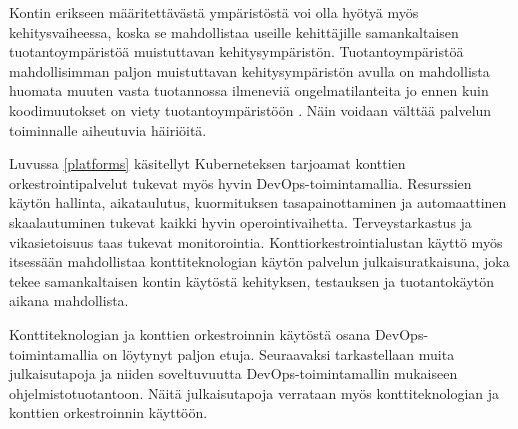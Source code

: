 Kontin erikseen määritettävästä ympäristöstä voi olla hyötyä myös kehitysvaiheessa, koska se mahdollistaa useille kehittäjille samankaltaisen tuotantoympäristöä muistuttavan kehitysympäristön.
Tuotantoympäristöä mahdollisimman paljon muistuttavan kehitysympäristön avulla on mahdollista huomata muuten vasta tuotannossa ilmeneviä ongelmatilanteita jo ennen kuin koodimuutokset on viety tuotantoympäristöön \cite{Narasimhulu23}.
Näin voidaan välttää palvelun toiminnalle aiheutuvia häiriöitä.

Luvussa \ref{platforms} käsitellyt Kuberneteksen tarjoamat konttien orkestrointipalvelut tukevat myös hyvin DevOps-toimintamallia.
Resurssien käytön hallinta, aikataulutus, kuormituksen tasapainottaminen ja automaattinen skaalautuminen tukevat kaikki hyvin operointivaihetta.
Terveystarkastus ja vikasietoisuus taas tukevat monitorointia.
Konttiorkestrointialustan käyttö myös itsessään mahdollistaa konttiteknologian käytön palvelun julkaisuratkaisuna, joka tekee samankaltaisen kontin käytöstä kehityksen, testauksen ja tuotantokäytön aikana mahdollista.

Konttiteknologian ja konttien orkestroinnin käytöstä osana DevOps-toimintamallia on löytynyt paljon etuja.
Seuraavaksi tarkastellaan muita julkaisutapoja ja niiden soveltuvuutta DevOps-toimintamallin mukaiseen ohjelmistotuotantoon.
Näitä julkaisutapoja verrataan myös konttiteknologian ja konttien orkestroinnin käyttöön.
